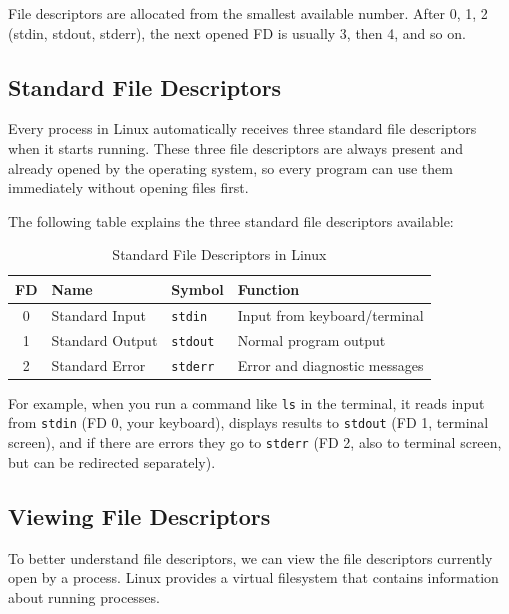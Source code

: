 \begin{tipbox}
	File descriptors are allocated from the smallest available number. After 0, 1, 2 (stdin, stdout, stderr), the next opened FD is usually 3, then 4, and so on.
\end{tipbox}

\subsection{Standard File Descriptors}

Every process in Linux automatically receives three standard file descriptors when it starts running. These three file descriptors are always present and already opened by the operating system, so every program can use them immediately without opening files first.

The following table explains the three standard file descriptors available:

\begin{table}[htbp]
	\centering
	\caption{Standard File Descriptors in Linux}
	\label{tab:standard-fd}
	\begin{tabular}{@{}clll@{}}
		\toprule
		\textbf{FD} & \textbf{Name}   & \textbf{Symbol} & \textbf{Function}             \\
		\midrule
		0           & Standard Input  & \texttt{stdin}  & Input from keyboard/terminal  \\
		1           & Standard Output & \texttt{stdout} & Normal program output         \\
		2           & Standard Error  & \texttt{stderr} & Error and diagnostic messages \\
		\bottomrule
	\end{tabular}
\end{table}

For example, when you run a command like \texttt{ls} in the terminal, it reads input from \texttt{stdin} (FD 0, your keyboard), displays results to \texttt{stdout} (FD 1, terminal screen), and if there are errors they go to \texttt{stderr} (FD 2, also to terminal screen, but can be redirected separately).

\subsection{Viewing File Descriptors}

To better understand file descriptors, we can view the file descriptors currently open by a process. Linux provides a virtual filesystem  that contains information about running processes.

